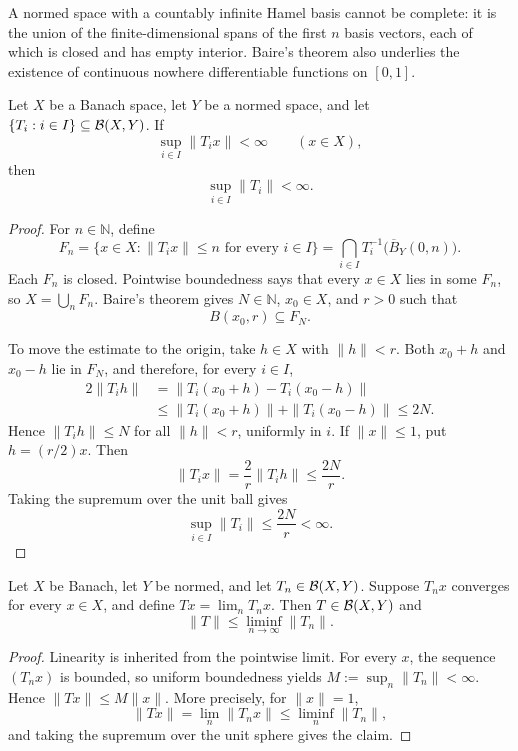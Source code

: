 \begin{noteexample}
A normed space with a countably infinite Hamel basis cannot be complete: it is
the union of the finite-dimensional spans of the first $n$ basis vectors, each
of which is closed and has empty interior.  Baire's theorem also underlies the
existence of continuous nowhere differentiable functions on $[0,1]$.
\end{noteexample}

\begin{notetheorem}
Let $X$ be a Banach space, let $Y$ be a normed space, and let
$\{T_i:i\in I\}\subseteq\mathcal{B}(X,Y)$.  If
\[
  \sup_{i\in I}\|T_i x\|<\infty
  \qquad(x\in X),
\]
then
\[
  \sup_{i\in I}\|T_i\|<\infty.
\]
\end{notetheorem}

\begin{proof}
For $n\in\mathbb N$, define
\[
  F_n
  =\{x\in X:\|T_i x\|\le n\text{ for every }i\in I\}
  =\bigcap_{i\in I}T_i^{-1}\bigl(\overline B_Y(0,n)\bigr).
\]
Each $F_n$ is closed.  Pointwise boundedness says that every $x\in X$ lies
in some $F_n$, so $X=\bigcup_nF_n$.  Baire's theorem gives
$N\in\mathbb N$, $x_0\in X$, and $r>0$ such that
\[
  B(x_0,r)\subseteq F_N.
\]

To move the estimate to the origin, take $h\in X$ with $\|h\|<r$.  Both
$x_0+h$ and $x_0-h$ lie in $F_N$, and therefore, for every $i\in I$,
\[
\begin{aligned}
  2\|T_i h\|
   &=\|T_i(x_0+h)-T_i(x_0-h)\|\\
   &\le\|T_i(x_0+h)\|+\|T_i(x_0-h)\|
    \le2N.
\end{aligned}
\]
Hence $\|T_i h\|\le N$ for all $\|h\|<r$, uniformly in $i$.
If $\|x\|\le1$, put $h=(r/2)x$.  Then
\[
  \|T_i x\|=\frac2r\|T_i h\|\le\frac{2N}{r}.
\]
Taking the supremum over the unit ball gives
\[
  \sup_{i\in I}\|T_i\|\le\frac{2N}{r}<\infty.
\]
\end{proof}

\begin{notetheorem}
Let $X$ be Banach, let $Y$ be normed, and let
$T_n\in\mathcal{B}(X,Y)$.  Suppose $T_nx$ converges for every $x\in X$, and define
$Tx=\lim_nT_nx$.  Then $T\in\mathcal{B}(X,Y)$ and
\[
  \|T\|\le\liminf_{n\to\infty}\|T_n\|.
\]
\end{notetheorem}

\begin{proof}
Linearity is inherited from the pointwise limit.  For every $x$, the sequence
$(T_nx)$ is bounded, so uniform boundedness yields
$M:=\sup_n\|T_n\|<\infty$.  Hence $\|Tx\|\le M\|x\|$.  More precisely,
for $\|x\|=1$,
\[
  \|Tx\|=\lim_n\|T_nx\|
  \le\liminf_n\|T_n\|,
\]
and taking the supremum over the unit sphere gives the claim.
\end{proof}

